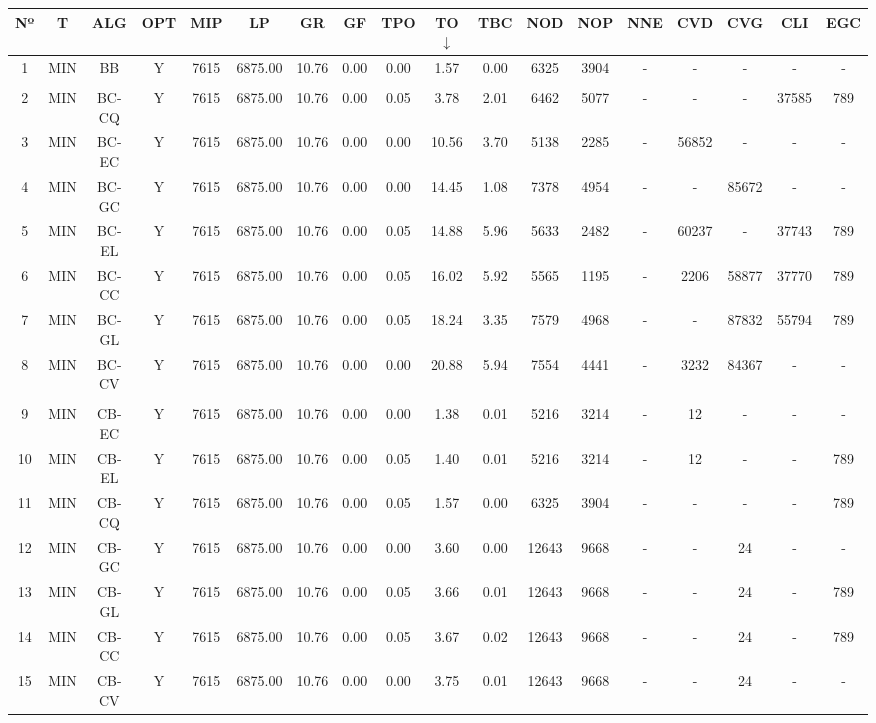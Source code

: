 {
\footnotesize\centering
\hspace*{-5mm}\begin{tabular}{ *{17}{c|} c }
\hline
\textbf{Nº} & \textbf{T} & \textbf{ALG} & \textbf{OPT} & \textbf{MIP} & \textbf{LP} & \textbf{GR} & \textbf{GF} & \textbf{TPO} & \textbf{TO} $\downarrow$ & \textbf{TBC} & \textbf{NOD} & \textbf{NOP} & \textbf{NNE} & \textbf{CVD} & \textbf{CVG} & \textbf{CLI} & \textbf{EGC}\\
\hline
1 & MIN & BB & Y & 7615 & 6875.00 & 10.76 & 0.00 & 0.00 & 1.57 & 0.00 & 6325 & 3904 & - & - & - & - & -\\
\hline
\multicolumn{18}{c}{}
\\
\hline
2 & MIN & BC-CQ & Y & 7615 & 6875.00 & 10.76 & 0.00 & 0.05 & 3.78 & 2.01 & 6462 & 5077 & - & - & - & 37585 & 789\\
\hline
3 & MIN & BC-EC & Y & 7615 & 6875.00 & 10.76 & 0.00 & 0.00 & 10.56 & 3.70 & 5138 & 2285 & - & 56852 & - & - & -\\
\hline
4 & MIN & BC-GC & Y & 7615 & 6875.00 & 10.76 & 0.00 & 0.00 & 14.45 & 1.08 & 7378 & 4954 & - & - & 85672 & - & -\\
\hline
5 & MIN & BC-EL & Y & 7615 & 6875.00 & 10.76 & 0.00 & 0.05 & 14.88 & 5.96 & 5633 & 2482 & - & 60237 & - & 37743 & 789\\
\hline
6 & MIN & BC-CC & Y & 7615 & 6875.00 & 10.76 & 0.00 & 0.05 & 16.02 & 5.92 & 5565 & 1195 & - & 2206 & 58877 & 37770 & 789\\
\hline
7 & MIN & BC-GL & Y & 7615 & 6875.00 & 10.76 & 0.00 & 0.05 & 18.24 & 3.35 & 7579 & 4968 & - & - & 87832 & 55794 & 789\\
\hline
8 & MIN & BC-CV & Y & 7615 & 6875.00 & 10.76 & 0.00 & 0.00 & 20.88 & 5.94 & 7554 & 4441 & - & 3232 & 84367 & - & -\\
\hline
\multicolumn{18}{c}{}
\\
\hline
9 & MIN & CB-EC & Y & 7615 & 6875.00 & 10.76 & 0.00 & 0.00 & 1.38 & 0.01 & 5216 & 3214 & - & 12 & - & - & -\\
\hline
10 & MIN & CB-EL & Y & 7615 & 6875.00 & 10.76 & 0.00 & 0.05 & 1.40 & 0.01 & 5216 & 3214 & - & 12 & - & - & 789\\
\hline
11 & MIN & CB-CQ & Y & 7615 & 6875.00 & 10.76 & 0.00 & 0.05 & 1.57 & 0.00 & 6325 & 3904 & - & - & - & - & 789\\
\hline
12 & MIN & CB-GC & Y & 7615 & 6875.00 & 10.76 & 0.00 & 0.00 & 3.60 & 0.00 & 12643 & 9668 & - & - & 24 & - & -\\
\hline
13 & MIN & CB-GL & Y & 7615 & 6875.00 & 10.76 & 0.00 & 0.05 & 3.66 & 0.01 & 12643 & 9668 & - & - & 24 & - & 789\\
\hline
14 & MIN & CB-CC & Y & 7615 & 6875.00 & 10.76 & 0.00 & 0.05 & 3.67 & 0.02 & 12643 & 9668 & - & - & 24 & - & 789\\
\hline
15 & MIN & CB-CV & Y & 7615 & 6875.00 & 10.76 & 0.00 & 0.00 & 3.75 & 0.01 & 12643 & 9668 & - & - & 24 & - & -\\
\hline
\end{tabular}\\
\vspace{4mm}
}

